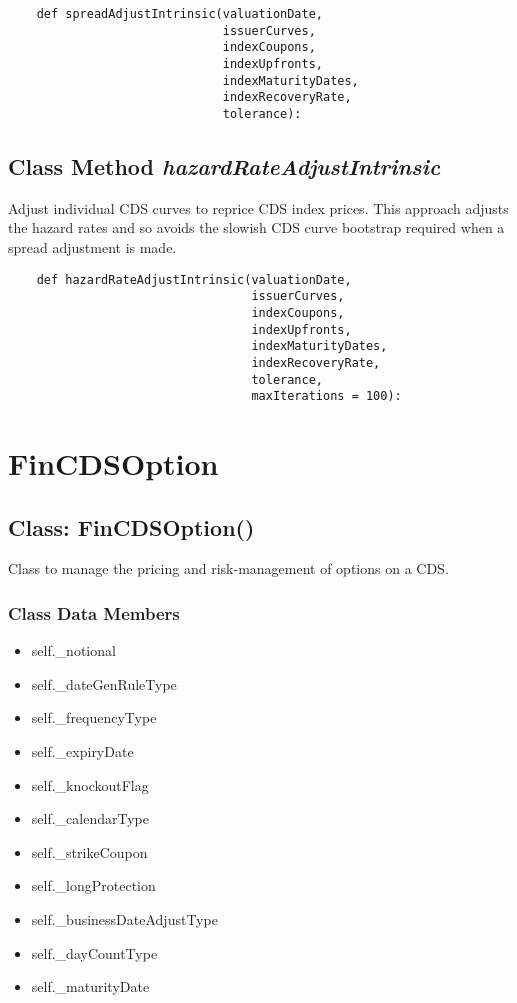 \documentclass[twoside,11pt]{book}
\begin{document}
\begin{lstlisting}
    def spreadAdjustIntrinsic(valuationDate,
                              issuerCurves,
                              indexCoupons,
                              indexUpfronts,
                              indexMaturityDates,
                              indexRecoveryRate,
                              tolerance):
\end{lstlisting}

\subsection{Class Method {\it hazardRateAdjustIntrinsic}}
Adjust individual CDS curves to reprice CDS index prices. This approach adjusts the hazard rates and so avoids the slowish CDS curve bootstrap required when a spread adjustment is made.

\begin{lstlisting}
    def hazardRateAdjustIntrinsic(valuationDate, 
                                  issuerCurves,
                                  indexCoupons,
                                  indexUpfronts,
                                  indexMaturityDates,
                                  indexRecoveryRate,
                                  tolerance,
                                  maxIterations = 100):
\end{lstlisting}

\newpage
\section{FinCDSOption}

\subsection{Class: FinCDSOption()}
Class to manage the pricing and risk-management of options on a CDS. 

\subsubsection{Class Data Members}
\begin{itemize}
\item{self.\_notional}
\item{self.\_dateGenRuleType}
\item{self.\_frequencyType}
\item{self.\_expiryDate}
\item{self.\_knockoutFlag}
\item{self.\_calendarType}
\item{self.\_strikeCoupon}
\item{self.\_longProtection}
\item{self.\_businessDateAdjustType}
\item{self.\_dayCountType}
\item{self.\_maturityDate}
\end{itemize}
\end{document}
